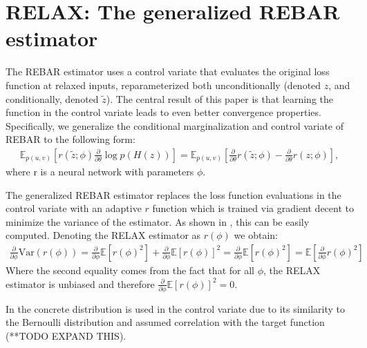 \documentclass{article}
\newcommand{\relaxed}{r}
\newcommand{\var}{\text{Var}}
\begin{document}
\section{RELAX: The generalized REBAR estimator}
The REBAR estimator uses a control variate that evaluates the original loss function at relaxed inputs, reparameterized both unconditionally (denoted $z$, and conditionally, denoted $\tilde{z}$).
The central result of this paper is that learning the function in the control variate leads to even better convergence properties.
Specifically, we generalize the conditional marginalization and control variate of REBAR to the following form:
\begin{align}
    \mathbb{E}_{p(u,v)}[\relaxed (\tilde{z};\phi)\frac{\partial}{\partial \theta}\log p(H(z))] = \mathbb{E}_{p(u,v)}[\frac{\partial}{\partial \theta} \relaxed(\tilde{z};\phi) - \frac{\partial}{\partial \theta} \relaxed(z; \phi)],
\end{align}
where \relaxed{} is a neural network with parameters $\phi$.

The generalized REBAR estimator replaces the loss function evaluations in the control variate with an adaptive $\relaxed$ function which is trained via gradient decent to minimize the variance of the estimator. As shown in \cite{tucker2017rebar}, this can be easily computed. Denoting the RELAX estimator as $r(\phi)$ we obtain:
\begin{align}
    \frac{\partial}{\partial\phi}\var{(r(\phi))} = \frac{\partial}{\partial\phi}\mathbb{E}[r(\phi)^2] + \frac{\partial}{\partial\phi}\mathbb{E}[r(\phi)]^2 = \frac{\partial}{\partial\phi}\mathbb{E}[r(\phi)^2] = \mathbb{E}[\frac{\partial}{\partial\phi}r(\phi)^2]
\end{align}
Where the second equality comes from the fact that for all $\phi$, the RELAX estimator is unbiased and therefore $\frac{\partial}{\partial\phi}\mathbb{E}[r(\phi)]^2 = 0$.


In \cite{tucker2017rebar} the concrete distribution \cite{maddison2016concrete} is used in the control variate due to its similarity to the Bernoulli distribution and assumed correlation with the target function (**TODO EXPAND THIS).
\end{document}
